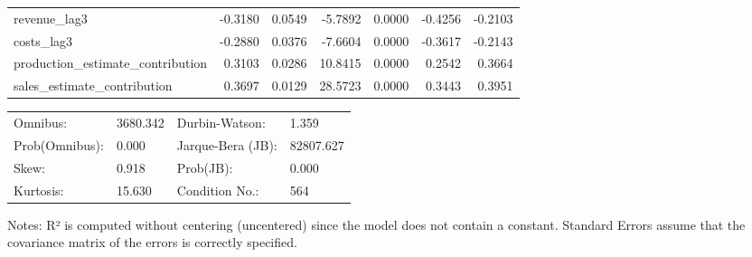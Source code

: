 \begin{table}
\begin{center}
\begin{tabular}{lrrrrrr}
revenue\_lag3                      & -0.3180 &   0.0549 &  -5.7892 &      0.0000 & -0.4256 & -0.2103  \\
costs\_lag3                        & -0.2880 &   0.0376 &  -7.6604 &      0.0000 & -0.3617 & -0.2143  \\
production\_estimate\_contribution &  0.3103 &   0.0286 &  10.8415 &      0.0000 &  0.2542 &  0.3664  \\
sales\_estimate\_contribution      &  0.3697 &   0.0129 &  28.5723 &      0.0000 &  0.3443 &  0.3951  \\
\hline
\end{tabular}
\end{center}

\begin{center}
\begin{tabular}{llll}
\hline
Omnibus:       & 3680.342 & Durbin-Watson:    & 1.359      \\
Prob(Omnibus): & 0.000    & Jarque-Bera (JB): & 82807.627  \\
Skew:          & 0.918    & Prob(JB):         & 0.000      \\
Kurtosis:      & 15.630   & Condition No.:    & 564        \\
\hline
\end{tabular}
\end{center}
\end{table}
\bigskip
Notes: \newline 
[1] R² is computed without centering (uncentered) since the                 model does not contain a constant. \newline 
[2] Standard Errors assume that the covariance matrix of the errors is correctly specified.